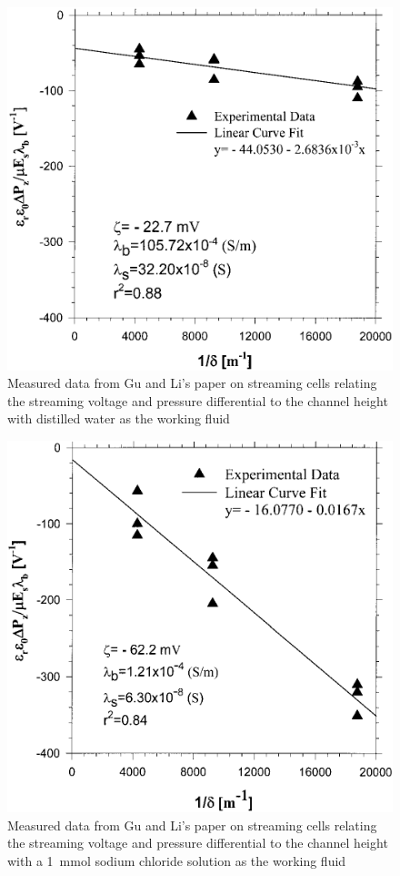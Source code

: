    \begin{figure}
        \centering
        \includegraphics{content/pt1/01-PowerHarvesting/graphics/GuLi_DIUF}
        \caption{\label{fig:Gu_Li_comparison_DUIF}Measured data from Gu and Li's paper on streaming cells relating the streaming voltage and pressure differential to the channel height with distilled water as the working fluid}
    \end{figure}

    \begin{figure}
        \centering
        \includegraphics{content/pt1/01-PowerHarvesting/graphics/GuLi_NaCl}
        \caption{\label{fig:Gu_Li_comparison_NaCl}Measured data from Gu and Li's paper on streaming cells relating the streaming voltage and pressure differential to the channel height with a \SI{1}{\milli\mole} sodium chloride solution as the working fluid}
    \end{figure}

